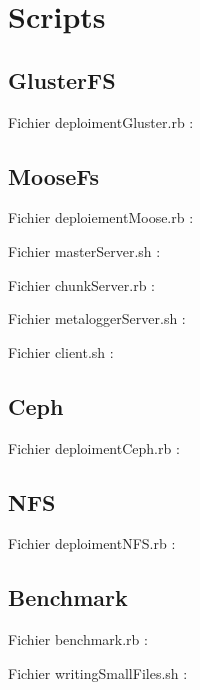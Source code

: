 \documentclass[12pt]{report}
\begin{document}
		\chapter{Scripts}
			\section{GlusterFS}
				Fichier deploimentGluster.rb :
				
			\section{MooseFs}
                                Fichier deploiementMoose.rb :
                                
                                Fichier masterServer.sh :
                                
\newpage
                                Fichier chunkServer.rb :
                                
                                Fichier metaloggerServer.sh :
                                
                                Fichier client.sh :
                                
			\section{Ceph}
			\label{DepCeph}
				Fichier deploimentCeph.rb :
				
			\section{NFS}
				Fichier deploimentNFS.rb :
				
			\section{Benchmark}
				Fichier benchmark.rb :
				

				Fichier writingSmallFiles.sh :
				
\end{document}
